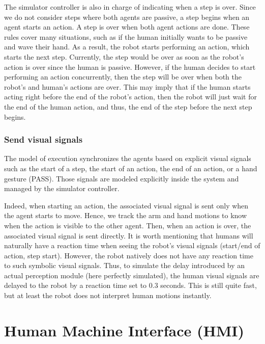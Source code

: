 The simulator controller is also in charge of indicating when a step is over. Since we do not consider steps where both agents are passive, a step begins when an agent starts an action. A step is over when both agent actions are done. These rules cover many situations, such as if the human initially wants to be passive and wave their hand. As a result, the robot starts performing an action, which starts the next step. Currently, the step would be over as soon as the robot's action is over since the human is passive. However, if the human decides to start performing an action concurrently, then the step will be over when both the robot's and human's actions are over. This may imply that if the human starts acting right before the end of the robot's action, then the robot will just wait for the end of the human action, and thus, the end of the step before the next step begins.  

\subsubsection{Send visual signals}

The model of execution synchronizes the agents based on explicit visual signals such as the start of a step, the start of an action, the end of an action, or a hand gesture (PASS). Those signals are modeled explicitly inside the system and managed by the simulator controller.

Indeed, when starting an action, the associated visual signal is sent only when the agent starts to move. Hence, we track the arm and hand motions to know when the action is visible to the other agent. Then, when an action is over, the associated visual signal is sent directly. It is worth mentioning that humans will naturally have a reaction time when seeing the robot's visual signals (start/end of action, step start). However, the robot natively does not have any reaction time to such symbolic visual signals. Thus, to simulate the delay introduced by an actual perception module (here perfectly simulated), the human visual signals are delayed to the robot by a reaction time set to 0.3 seconds. This is still quite fast, but at least the robot does not interpret human motions instantly.   




\section{Human Machine Interface (HMI)}

